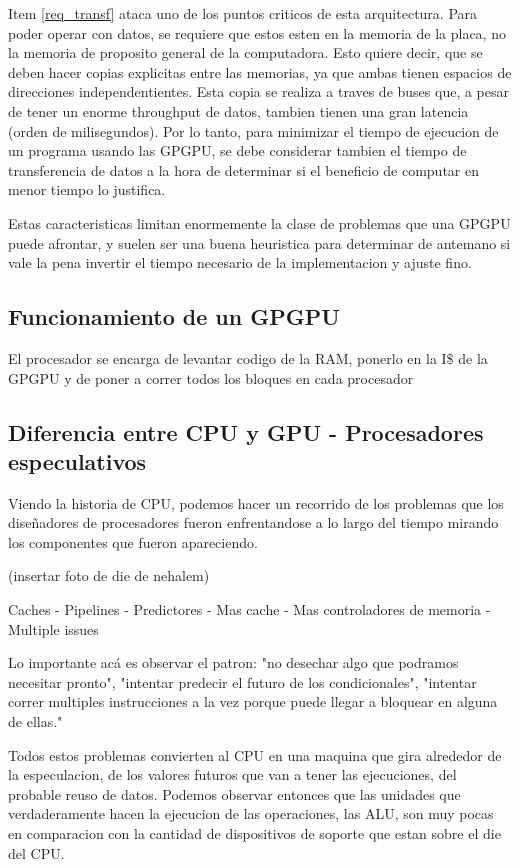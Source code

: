 Item \ref{req_transf} ataca uno de los puntos criticos de esta arquitectura. Para poder
operar con datos, se requiere que estos esten en la memoria de la placa, no la memoria
de proposito general de la computadora. Esto quiere decir, que se deben hacer copias
explicitas entre las memorias, ya que ambas tienen espacios de direcciones independentientes.
Esta copia se realiza a traves de buses que, a pesar de tener un enorme throughput de
datos, tambien tienen una gran latencia (orden de milisegundos). Por lo tanto, para minimizar
el tiempo de ejecucion de un programa usando las GPGPU, se debe considerar tambien el
tiempo de transferencia de datos a la hora de determinar si el beneficio de computar en
menor tiempo lo justifica. 

Estas caracteristicas limitan enormemente la clase de problemas que una GPGPU puede
afrontar, y suelen ser una buena heuristica para determinar de antemano si vale la pena
invertir el tiempo necesario de la implementacion y ajuste fino.

\subsection{Funcionamiento de un GPGPU}
El procesador se encarga de levantar codigo de la RAM, ponerlo en la I\$ de la GPGPU
y de poner a correr todos los bloques en cada procesador


\subsection{Diferencia entre CPU y GPU - Procesadores especulativos}
Viendo la historia de CPU, podemos hacer un recorrido de los problemas que los dise\~nadores de procesadores
fueron enfrentandose a lo largo del tiempo mirando los componentes que fueron apareciendo.

(insertar foto de die de nehalem)

Caches - Pipelines - Predictores - Mas cache - Mas controladores de memoria - Multiple issues

Lo importante ac\'a es observar el patron: "no desechar algo que podramos necesitar pronto", 
"intentar predecir el futuro de los condicionales", "intentar correr multiples instrucciones a la vez 
porque puede llegar a bloquear en alguna de ellas."

Todos estos problemas convierten al CPU en una maquina que gira alrededor de la especulacion, 
de los valores futuros que van a tener las ejecuciones, del probable reuso de datos.
Podemos observar entonces que las unidades que verdaderamente hacen la ejecucion de las operaciones,
las ALU, son muy pocas en comparacion con la cantidad de dispositivos de soporte que estan
sobre el die del CPU. 

